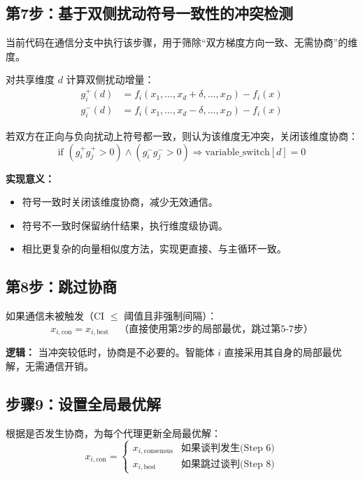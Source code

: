 \documentclass[11pt,a3paper]{ctexart}
\begin{document}
\subsection{第7步：基于双侧扰动符号一致性的冲突检测}
当前代码在通信分支中执行该步骤，用于筛除“双方梯度方向一致、无需协商”的维度。

对共享维度 \(d\) 计算双侧扰动增量：
\begin{align}
g_i^{+}(d) &= f_i(x_1, \ldots, x_d + \delta, \ldots, x_D) - f_i(x) \\
g_i^{-}(d) &= f_i(x_1, \ldots, x_d - \delta, \ldots, x_D) - f_i(x)
\end{align}

若双方在正向与负向扰动上符号都一致，则认为该维度无冲突，关闭该维度协商：
\begin{equation}
\text{if } (g_i^+ g_j^+ > 0) \land (g_i^- g_j^- > 0) \Rightarrow \text{variable\_switch}[d] = 0
\end{equation}

\textbf{实现意义：}
\begin{itemize}
    \item 符号一致时关闭该维度协商，减少无效通信。
    \item 符号不一致时保留纳什结果，执行维度级协调。
    \item 相比更复杂的向量相似度方法，实现更直接、与主循环一致。
\end{itemize}

\subsection{第8步：跳过协商}

如果通信未被触发（CI $\leq$ 阈值且非强制间隔）：
\begin{equation}
x_{i,\text{con}} = x_{i,\text{best}} \quad \text{（直接使用第2步的局部最优，跳过第5-7步）}
\end{equation}

\textbf{逻辑：} 当冲突较低时，协商是不必要的。智能体 $i$ 直接采用其自身的局部最优解，无需通信开销。
\subsection{步骤9：设置全局最优解}
根据是否发生协商，为每个代理更新全局最优解：
\begin{equation}
x_{i,\text{con}} = \begin{cases}
x_{i,\text{consensus}} & \text{如果谈判发生(Step 6)} \\
x_{i,\text{best}} & \text{如果跳过谈判(Step 8)}
\end{cases}
\end{equation}
\end{document}
